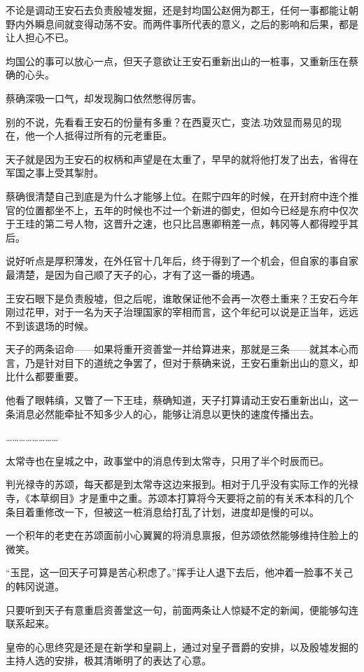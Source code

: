 不论是调动王安石去负责殷墟发掘，还是封均国公赵佣为郡王，任何一事都能让朝野内外瞬息间就变得动荡不安。而两件事所代表的意义，之后的影响和后果，都是让人担心不已。

均国公的事可以放心一点，但天子意欲让王安石重新出山的一桩事，又重新压在蔡确的心头。

蔡确深吸一口气，却发现胸口依然憋得厉害。

别的不说，先看看王安石的份量有多重？在西夏灭亡，变法.功效显而易见的现在，他一个人抵得过所有的元老重臣。

天子就是因为王安石的权柄和声望是在太重了，早早的就将他打发了出去，省得在军国之事上受其掣肘。

蔡确很清楚自己到底是为什么才能够上位。在熙宁四年的时候，在开封府中连个推官的位置都坐不上，五年的时候也不过一个新进的御史，但如今已经是东府中仅次于王珪的第二号人物，这晋升之速，也只比吕惠卿稍差一点，韩冈等人都得瞠乎其后。

说好听点是厚积薄发，在外任官十几年后，终于得到了一个机会，但自家的事自家最清楚，是因为自己顺了天子的心，才有了这一番的境遇。

王安石眼下是负责殷墟，但之后呢，谁敢保证他不会再一次卷土重来？王安石今年刚过花甲，对于一名为天子治理国家的宰相而言，这个年纪可以说是正当年，远远不到该退场的时候。

天子的两条诏命——如果将重开资善堂一并给算进来，那就是三条——就其本心而言，乃是针对目下的道统之争罢了，但对于蔡确来说，王安石重新出山的意义，却比什么都要重要。

他看了眼韩缜，又瞥了一下王珪，蔡确知道，天子打算请动王安石重新出山，这一条消息必然能牵扯不知多少人的心，能够让消息以更快的速度传播出去。

……………………

太常寺也在皇城之中，政事堂中的消息传到太常寺，只用了半个时辰而已。

判光禄寺的苏颂，每天都是到太常寺这边来报到。相对于几乎没有实际工作的光禄寺，《本草纲目》才是重中之重。苏颂本打算将今天要将之前的有关禾本科的几个条目着重修改一下，但被这一桩消息给打乱了计划，进度却是慢的可以。

一个积年的老吏在苏颂面前小心翼翼的将消息禀报，但苏颂依然能够维持住脸上的微笑。

“玉昆，这一回天子可算是苦心积虑了。”挥手让人退下去后，他冲着一脸事不关己的韩冈说道。

只要听到天子有意重启资善堂这一句，前面两条让人惊疑不定的新闻，便能够勾连联系起来。

皇帝的心思终究是还是在新学和皇嗣上，通过对皇子晋爵的安排，以及殷墟发掘的主持人选的安排，极其清晰明了的表达了心意。

